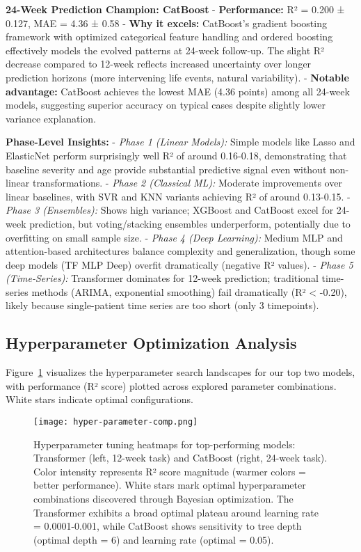 \documentclass[conference]{IEEEtran}
\begin{document}
\textbf{24-Week Prediction Champion: CatBoost}
- \textbf{Performance:} R² = 0.200 ± 0.127, MAE = 4.36 ± 0.58
- \textbf{Why it excels:} CatBoost's gradient boosting framework with optimized categorical feature handling and ordered boosting effectively models the evolved patterns at 24-week follow-up. The slight R² decrease compared to 12-week reflects increased uncertainty over longer prediction horizons (more intervening life events, natural variability).
- \textbf{Notable advantage:} CatBoost achieves the lowest MAE (4.36 points) among all 24-week models, suggesting superior accuracy on typical cases despite slightly lower variance explanation.


\textbf{Phase-Level Insights:}
- \textit{Phase 1 (Linear Models):} Simple models like Lasso and ElasticNet perform surprisingly well R² of around 0.16-0.18, demonstrating that baseline severity and age provide substantial predictive signal even without non-linear transformations.
- \textit{Phase 2 (Classical ML):} Moderate improvements over linear baselines, with SVR and KNN variants achieving R² of around 0.13-0.15.
- \textit{Phase 3 (Ensembles):} Shows high variance; XGBoost and CatBoost excel for 24-week prediction, but voting/stacking ensembles underperform, potentially due to overfitting on small sample size.
- \textit{Phase 4 (Deep Learning):} Medium MLP and attention-based architectures balance complexity and generalization, though some deep models (TF MLP Deep) overfit dramatically (negative R² values).
- \textit{Phase 5 (Time-Series):} Transformer dominates for 12-week prediction; traditional time-series methods (ARIMA, exponential smoothing) fail dramatically (R² < -0.20), likely because single-patient time series are too short (only 3 timepoints).


\subsection{Hyperparameter Optimization Analysis}

Figure~\ref{fig:hyper_param_tuned} visualizes the hyperparameter search landscapes for our top two models, with performance (R² score) plotted across explored parameter combinations. White stars indicate optimal configurations.


\begin{figure}[h]
    \centering
    \texttt{[image: hyper-parameter-comp.png]}
    \caption{Hyperparameter tuning heatmaps for top-performing models: Transformer (left, 12-week task) and CatBoost (right, 24-week task). Color intensity represents R² score magnitude (warmer colors = better performance). White stars mark optimal hyperparameter combinations discovered through Bayesian optimization. The Transformer exhibits a broad optimal plateau around learning rate = 0.0001-0.001, while CatBoost shows sensitivity to tree depth (optimal depth = 6) and learning rate (optimal = 0.05).}
    \label{fig:hyper_param_tuned}
\end{figure}
\end{document}
